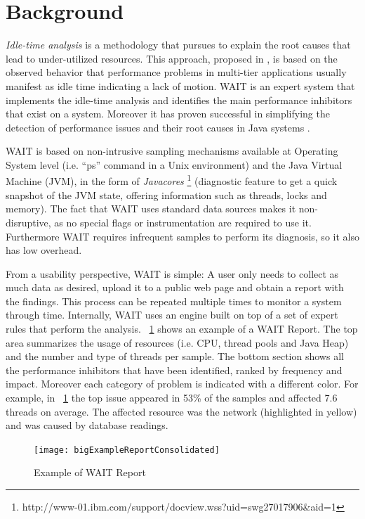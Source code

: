 \documentclass[runningheads,a4paper]{llncs}
\begin{document}
\section{Background}
\label{Background}
\vspace{-5pt}
\emph{Idle-time analysis} is a methodology that pursues to explain the root
causes that lead to under-utilized resources. This approach, proposed in
\cite{Altman2010}, is based on the observed behavior that performance problems in multi-tier
applications usually manifest as idle time indicating a lack of motion.
WAIT is an expert system that implements the idle-time analysis and identifies
the main performance inhibitors that exist on a system. Moreover it has proven successful in simplifying the detection of performance issues and their root causes in Java
systems \cite{Altman2010,Wu1}.

WAIT is based on non-intrusive sampling mechanisms available at
Operating System level (i.e. ``ps'' command in a Unix environment) and the Java
Virtual Machine (JVM), in the form of \emph{Javacores}
\footnote{http://www-01.ibm.com/support/docview.wss?uid=swg27017906\&aid=1}
(diagnostic feature to get a quick snapshot of the JVM state, offering
information such as threads, locks and memory). The fact that WAIT uses standard
data sources makes it non-disruptive, as no special flags or instrumentation are
required to use it. Furthermore WAIT requires infrequent samples to perform its
diagnosis, so it also has low overhead.

From a usability perspective, WAIT is simple: A user only needs to
collect as much data as desired, upload it to a public web page and obtain a
report with the findings. This process can be repeated multiple times to monitor a
system through time. Internally, WAIT uses an engine built on top of a set of 
expert rules that perform the analysis. \figurename ~\ref{fig_WAITReport} shows an
example of a WAIT Report. The top area summarizes the usage of resources (i.e.
CPU, thread pools and Java Heap) and the number and type of threads per sample. 
The bottom section shows all the performance inhibitors that have been identified, ranked
by frequency and impact. Moreover each category of problem is indicated with a
different color. For example, in \figurename ~\ref{fig_WAITReport} the top issue
appeared in 53\% of the samples and affected 7.6 threads on average. The
affected resource was the network (highlighted in yellow) and was caused by
database readings.

\begin{figure}[!h]
\centering
\texttt{[image: bigExampleReportConsolidated]}
\caption{Example of WAIT Report}
\label{fig_WAITReport}
\end{figure}
\end{document}
